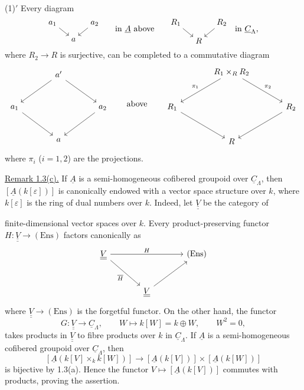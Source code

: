 (1)$'$ Every diagram
\[
\begin{tikzcd}[cramped,column sep=small,row sep=small]
a_1 \arrow[dr] & & a_2 \arrow[dl] \\
& a &
\end{tikzcd}
\qquad\text{in }\underline A\text{ above}\qquad
\begin{tikzcd}[cramped,column sep=small,row sep=small]
R_1 \arrow[dr] & & R_2 \arrow[dl] \\
& R &
\end{tikzcd}
\quad\text{in }\underline C_\Lambda,
\]
where $R_2\longrightarrow R$ is surjective, can be completed to a
commutative diagram
\[
\begin{tikzcd}[row sep=large,column sep=large]
& a' \arrow[dl] \arrow[dr] & \\
a_1 \arrow[dr] & & a_2 \arrow[dl] \\
& a &
\end{tikzcd}
\qquad\text{above}\qquad
\begin{tikzcd}[row sep=large,column sep=large]
& R_1\times_RR_2 \arrow[dl,"\pi_1"'] \arrow[dr,"\pi_2"] & \\
R_1 \arrow[dr] & & R_2 \arrow[dl] \\
& R &
\end{tikzcd}
\]
where $\pi_i$ ($i=1,2$) are the projections.

\underline{Remark 1.3(c).} If $\underline A$ is a semi-homogeneous
cofibered groupoid over $\underline C_\Lambda$, then
$[\underline A(k[\varepsilon])]$ is canonically endowed with a vector
space structure over $k$, where $k[\varepsilon]$ is the ring of dual
numbers over $k$. Indeed, let $\underline{\underline V}$ be the category
of


finite-dimensional vector spaces over $k$. Every product-preserving
functor $H:\underline{\underline V}\longrightarrow(\mathrm{Ens})$
factors canonically as
\[
\begin{tikzcd}[row sep=large,column sep=large]
\underline{\underline V} \arrow[rr,"H"]
 \arrow[dr,"\overline H"'] & & (\mathrm{Ens}) \\
& \underline{\underline V} \arrow[ur] &
\end{tikzcd}
\]
where $\underline{\underline V}\longrightarrow(\mathrm{Ens})$ is the
forgetful functor. On the other hand, the functor
\[
 G:\underline{\underline V}\longrightarrow\underline C_\Lambda,
 \qquad W\longmapsto k[W]=k\oplus W,\qquad W^2=0,
\]
takes products in $\underline{\underline V}$ to fibre products over $k$
in $\underline C_\Lambda$. If $\underline A$ is a semi-homogeneous
cofibered groupoid over $\underline C_\Lambda$, then
\[
 [\underline A(k[V]\times_k k[W])]
 \longrightarrow
 [\underline A(k[V])]\times[\underline A(k[W])]
\]
is bijective by 1.3(a). Hence the functor
$V\longmapsto[\underline A(k[V])]$ commutes with products, proving the
assertion.
